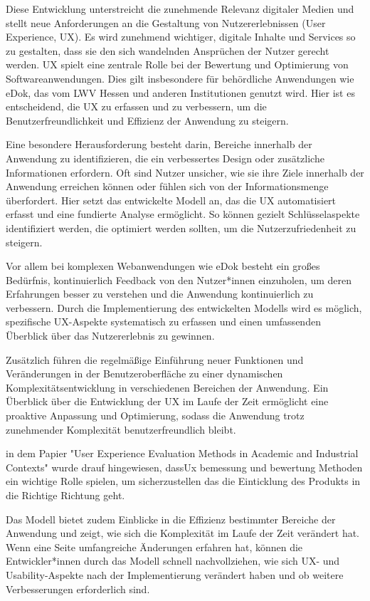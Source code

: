 \documentclass[12pt,oneside]{article}
\begin{document}
Diese Entwicklung unterstreicht die zunehmende Relevanz digitaler Medien und stellt neue Anforderungen an die Gestaltung von Nutzererlebnissen (User Experience, UX). Es wird zunehmend wichtiger, digitale Inhalte und Services so zu gestalten, dass sie den sich wandelnden Ansprüchen der Nutzer gerecht werden. UX spielt eine zentrale Rolle bei der Bewertung und Optimierung von Softwareanwendungen. Dies gilt insbesondere für behördliche Anwendungen wie eDok, das vom LWV Hessen und anderen Institutionen genutzt wird. Hier ist es entscheidend, die UX zu erfassen und zu verbessern, um die Benutzerfreundlichkeit und Effizienz der Anwendung zu steigern.

Eine besondere Herausforderung besteht darin, Bereiche innerhalb der Anwendung zu identifizieren, die ein verbessertes Design oder zusätzliche Informationen erfordern. Oft sind Nutzer unsicher, wie sie ihre Ziele innerhalb der Anwendung erreichen können oder fühlen sich von der Informationsmenge überfordert. Hier setzt das entwickelte Modell an, das die UX automatisiert erfasst und eine fundierte Analyse ermöglicht. So können gezielt Schlüsselaspekte identifiziert werden, die optimiert werden sollten, um die Nutzerzufriedenheit zu steigern.

Vor allem bei komplexen Webanwendungen wie eDok besteht ein großes Bedürfnis, kontinuierlich Feedback von den Nutzer*innen einzuholen, um deren Erfahrungen besser zu verstehen und die Anwendung kontinuierlich zu verbessern. Durch die Implementierung des entwickelten Modells wird es möglich, spezifische UX-Aspekte systematisch zu erfassen und einen umfassenden Überblick über das Nutzererlebnis zu gewinnen.

Zusätzlich führen die regelmäßige Einführung neuer Funktionen und Veränderungen in der Benutzeroberfläche zu einer dynamischen Komplexitätsentwicklung
 in verschiedenen Bereichen der Anwendung. Ein Überblick über die Entwicklung der UX im Laufe der Zeit ermöglicht eine proaktive Anpassung und Optimierung, 
sodass die Anwendung trotz zunehmender Komplexität benutzerfreundlich bleibt.

in dem Papier "User Experience Evaluation Methods in Academic and
Industrial Contexts" wurde drauf hingewiesen, dassUx bemessung und bewertung Methoden 
 ein wichtige Rolle spielen, um sicherzustellen das die Einticklung des Produkts in die Richtige Richtung geht.\cite{Virpi}

Das Modell bietet zudem Einblicke in die Effizienz bestimmter Bereiche der Anwendung und zeigt, wie sich die Komplexität im Laufe der Zeit verändert hat. Wenn eine Seite umfangreiche Änderungen erfahren hat, können die Entwickler*innen durch das Modell schnell nachvollziehen, wie sich UX- und Usability-Aspekte nach der Implementierung verändert haben und ob weitere Verbesserungen erforderlich sind.
\end{document}
